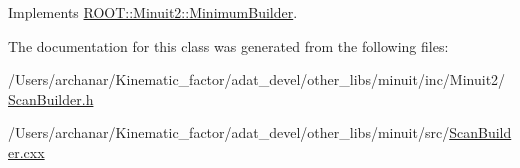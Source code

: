 Implements \mbox{\hyperlink{classROOT_1_1Minuit2_1_1MinimumBuilder_aefaa624436afa8195af1f3393a35981f}{R\+O\+O\+T\+::\+Minuit2\+::\+Minimum\+Builder}}.



The documentation for this class was generated from the following files\+:\begin{DoxyCompactItemize}
\item 
/\+Users/archanar/\+Kinematic\+\_\+factor/adat\+\_\+devel/other\+\_\+libs/minuit/inc/\+Minuit2/\mbox{\hyperlink{other__libs_2minuit_2inc_2Minuit2_2ScanBuilder_8h}{Scan\+Builder.\+h}}\item 
/\+Users/archanar/\+Kinematic\+\_\+factor/adat\+\_\+devel/other\+\_\+libs/minuit/src/\mbox{\hyperlink{ScanBuilder_8cxx}{Scan\+Builder.\+cxx}}\end{DoxyCompactItemize}
